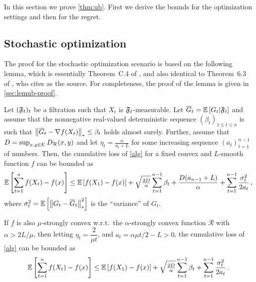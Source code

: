 
In this section we prove \cref{thm:ub}. First we derive the bounds for the optimization settings and then for the regret. 

\subsection{Stochastic optimization}

The proof for the stochastic optimization scenario is based on the following lemma,
which is essentially Theorem~C.4 of \citet{MahdaviPhd:2014}, and also identical to Theorem~6.3 of \citet{Bu:Convex14}, who cites \citet{Dekel:minibatch12} as the source. For completeness, the proof of the lemma is given in \cref{sec:lemub-proof}.

\begin{lemma}
\label{lem:ub}
Let $({\mathfrak{F}}_t)_{t}$ be a filtration such that $X_t$ is ${{\mathfrak{F}}}_t$-measurable.
Let $\overline G_t = \mathbb{E}\left[G_t|{{\mathfrak{F}}}_t\right]$
and assume that the nonnegative real-valued deterministic sequence $(\beta_t)_{1\le t\le n}$ is such that
$\left\|\overline G_t - \nabla {f}(X_t)\right\|_* \le \beta_t$ holds almost surely.
Further, assume that $D=\sup_{x,y\in \mathcal{K}} D_{\mathcal{R}}(x,y)$ and let $\eta_t = \frac{\alpha}{a_t+L}$ for some increasing
sequence $(a_t)_{t=1}^{n-1}$ of numbers. Then, the cumulative loss of \cref{alg} for a fixed convex and $L$-smooth  function $f$ can be bounded as
\begin{align*}
\mathbb{E}\left[ \sum_{t=1}^n {f}(X_t) - {f}(x) \right]
\le 	 \mathbb{E}\left[{f}(X_1)-{f}(x)\right]+
  \sqrt{\tfrac{2D}{\alpha}} \sum_{t=1}^{n-1} \beta_t
 +\frac{D(a_{n-1}+L)}{\alpha} +
	  \sum_{t=1}^{n-1}\frac{\sigma_t^2}{2a_t}\,,
\end{align*}
where $\sigma_t^2 = \mathbb{E}\left[ \left\|G_t-\overline G_t\right\|_*^2\right]$ is the ``variance'' of $G_t$.

If ${{f}}$ is also $\mu$-strongly convex w.r.t.\  the $\alpha$-strongly convex function $\mathcal{R}$ with $\alpha > 2L/\mu$, then letting $\eta_t = \dfrac{2}{\mu t}$, and $a_t = \alpha \mu t/2-L > 0$, the cumulative loss of  \cref{alg} can be bounded as
\begin{align*}
 \mathbb{E}\left[ \sum_{t=1}^n {f}(X_t) - {f}(x) \right]
\le 	 \mathbb{E}\left[{f}(X_1)-{f}(x)\right]+
 \sqrt{\tfrac{2D}{\alpha}} \sum_{t=1}^{n-1} \beta_t
 +\sum_{t=1}^{n-1}\frac{\sigma_t^2}{2a_t}\,.
\end{align*}
\end{lemma}

